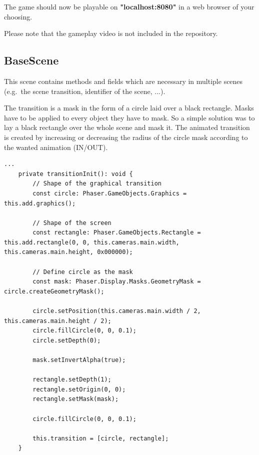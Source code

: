 The game should now be playable on \textbf{"localhost:8080"} in a web browser of your choosing.

Please note that the gameplay video is not included in the repository.

\subsection{BaseScene}\label{subsec:basescene}
This scene contains methods and fields which are necessary in multiple scenes
(e.g.\ the scene transition, identifier of the scene, ...).

The transition is a mask in the form of a circle laid over a black rectangle.
Masks have to be applied to every object they have to mask.
So a simple solution was to lay a black rectangle over the whole scene and mask it.
The animated transition is created by increasing or decreasing the radius of the circle
mask according to the wanted animation (IN/OUT).

\begin{lstlisting}[style=TypeScript, caption={BaseScene.ts}]
    ...
    private transitionInit(): void {
        // Shape of the graphical transition
        const circle: Phaser.GameObjects.Graphics = this.add.graphics();

        // Shape of the screen
        const rectangle: Phaser.GameObjects.Rectangle = this.add.rectangle(0, 0, this.cameras.main.width, this.cameras.main.height, 0x000000);

        // Define circle as the mask
        const mask: Phaser.Display.Masks.GeometryMask = circle.createGeometryMask();

        circle.setPosition(this.cameras.main.width / 2, this.cameras.main.height / 2);
        circle.fillCircle(0, 0, 0.1);
        circle.setDepth(0);

        mask.setInvertAlpha(true);

        rectangle.setDepth(1);
        rectangle.setOrigin(0, 0);
        rectangle.setMask(mask);

        circle.fillCircle(0, 0, 0.1);

        this.transition = [circle, rectangle];
    }
\end{lstlisting}

